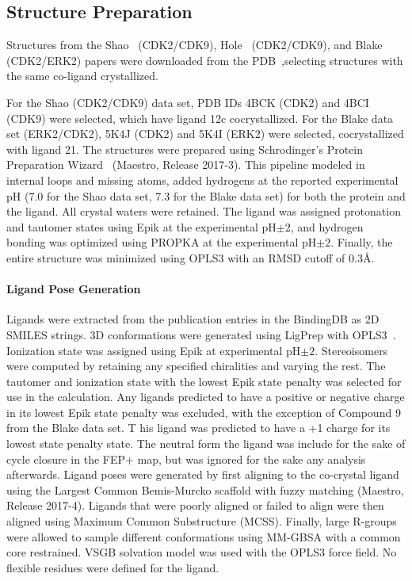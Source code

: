 \documentclass[phd,tocprelim]{cornell}
\begin{document}
\subsection{Structure Preparation}
Structures from the Shao~\citep{Shao2013-oe} (CDK2/CDK9), Hole~\citep{Hole2013-sr} (CDK2/CDK9), and Blake~\citep{Blake2016-su} (CDK2/ERK2) papers were downloaded from the PDB~\citep{Berman2002-hg},selecting structures with the same co-ligand crystallized. 

For the Shao (CDK2/CDK9) data set, PDB IDs 4BCK (CDK2) and 4BCI (CDK9) were selected, which have ligand 12c cocrystallized. 
For the Blake data set (ERK2/CDK2), 5K4J (CDK2) and 5K4I (ERK2) were selected, cocrystallized with ligand 21. 
The structures were prepared using Schrodinger’s Protein Preparation Wizard~\citep{Sastry2013-ax} (Maestro, Release 2017-3). 
This pipeline modeled in internal loops and missing atoms, added hydrogens at the reported experimental pH (7.0 for the Shao data set, 7.3 for the Blake data set) for both the protein and the ligand. 
All crystal waters were retained. 
The ligand was assigned protonation and tautomer states using Epik at the experimental pH$\pm2$, and hydrogen bonding was optimized using PROPKA at the experimental pH$\pm2$. 
Finally, the entire structure was minimized using OPLS3 with an RMSD cutoff of 0.3\AA.

\paragraph{Ligand Pose Generation}

Ligands were extracted from the publication entries in the BindingDB as 2D SMILES strings. 
3D conformations were generated using LigPrep with OPLS3~\citep{Harder2016-zn}. 
Ionization state was assigned using Epik at experimental pH$\pm2$. Stereoisomers were computed by retaining any specified chiralities and varying the rest. 
The tautomer and ionization state with the lowest Epik state penalty was selected for use in the calculation. 
Any ligands predicted to have a positive or negative charge in its lowest Epik state penalty was excluded, with the exception of Compound 9 from the Blake data set. T
his ligand was predicted to have a +1 charge for its lowest state penalty state. The neutral form the ligand was include for the sake of cycle closure in the FEP+ map, but was ignored for the sake any analysis afterwards. 
Ligand poses were generated by first aligning to the co-crystal ligand using the Largest Common Bemis-Murcko scaffold with fuzzy matching (Maestro, Release 2017-4). 
Ligands that were poorly aligned or failed to align were then aligned using Maximum Common Substructure (MCSS). 
Finally, large R-groups were allowed to sample different conformations using MM-GBSA with a common core restrained. VSGB solvation model was used with the OPLS3 force field. 
No flexible residues were defined for the ligand. 
\end{document}
